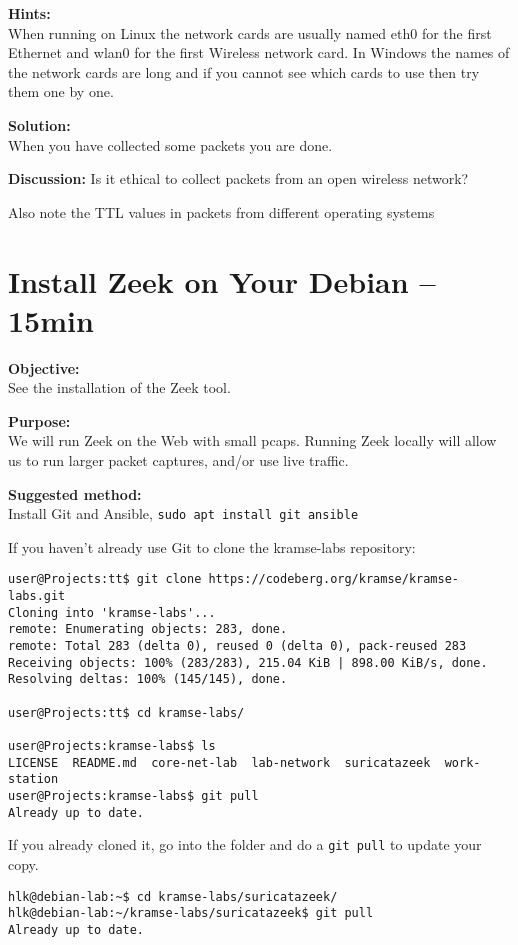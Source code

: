 \documentclass[a4paper,11pt,notitlepage]{report}
\begin{document}
{\bf Hints:}\\
When running on Linux the network cards are usually named eth0 for the first Ethernet and wlan0 for the first Wireless network card. In Windows the names of the network cards are long and if you cannot see which cards to use then try them one by one.

{\bf Solution:}\\
When you have collected some packets you are done.

{\bf Discussion:}
Is it ethical to collect packets from an open wireless network?

Also note the TTL values in packets from different operating systems


\chapter{Install Zeek on Your Debian -- 15min}
\label{ex:zeek-on-debian}

{\bf Objective:}\\
See the installation of the Zeek tool.

{\bf Purpose:}\\
We will run Zeek on the Web with small pcaps. Running Zeek locally will allow us to run larger packet captures, and/or use live traffic.

{\bf Suggested method:}\\
Install Git and Ansible, \verb+sudo apt install git ansible+

If you haven't already use Git to clone the kramse-labs repository:

\begin{verbatim}
user@Projects:tt$ git clone https://codeberg.org/kramse/kramse-labs.git
Cloning into 'kramse-labs'...
remote: Enumerating objects: 283, done.
remote: Total 283 (delta 0), reused 0 (delta 0), pack-reused 283
Receiving objects: 100% (283/283), 215.04 KiB | 898.00 KiB/s, done.
Resolving deltas: 100% (145/145), done.

user@Projects:tt$ cd kramse-labs/

user@Projects:kramse-labs$ ls
LICENSE  README.md  core-net-lab  lab-network  suricatazeek  work-station
user@Projects:kramse-labs$ git pull
Already up to date.
\end{verbatim}

If you already cloned it, go into the folder and do a \verb+git pull+ to update your copy.
\begin{verbatim}
hlk@debian-lab:~$ cd kramse-labs/suricatazeek/
hlk@debian-lab:~/kramse-labs/suricatazeek$ git pull
Already up to date.
\end{verbatim}
\end{document}
